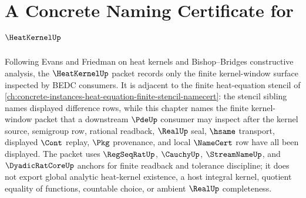 \chapter{A Concrete Naming Certificate for $\HeatKernelUp$}
\label{ch:concrete-instances-heat-kernel-namecert}

Following Evans and Friedman on heat kernels and Bishop--Bridges constructive
analysis, the $\HeatKernelUp$ packet records only the finite kernel-window
surface inspected by BEDC consumers. It is adjacent to the finite heat-equation
stencil of
\autoref{ch:concrete-instances-heat-equation-finite-stencil-namecert}: the
stencil sibling names displayed difference rows, while this chapter names the
finite kernel-window packet that a downstream $\PdeUp$ consumer may inspect
after the kernel source, semigroup row, rational readback, $\RealUp$ seal,
$\hsame$ transport, displayed $\Cont$ replay, $\Pkg$ provenance, and local
$\NameCert$ row have all been displayed. The packet uses $\RegSeqRatUp$,
$\CauchyUp$, $\StreamNameUp$, and $\DyadicRatCoreUp$ anchors for finite
readback and tolerance discipline; it does not export global analytic
heat-kernel existence, a host integral kernel, quotient equality of functions,
countable choice, or ambient $\RealUp$ completeness.

